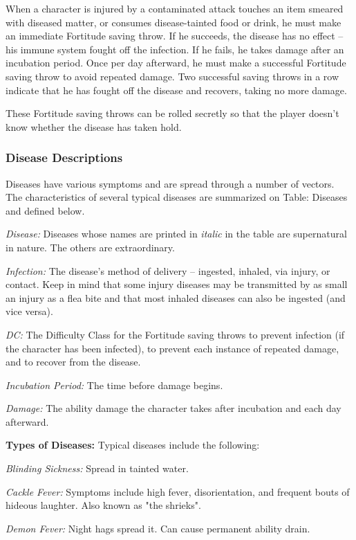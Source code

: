 When a character is injured by a contaminated attack touches an item smeared with 
diseased matter, or consumes disease-tainted food or drink, he must make an immediate 
Fortitude saving throw. If he succeeds, the disease has no effect -- his immune 
system fought off the infection. If he fails, he takes damage after an incubation 
period. Once per day afterward, he must make a successful Fortitude saving throw 
to avoid repeated damage. Two successful saving throws in a row indicate that he 
has fought off the disease and recovers, taking no more damage.

These Fortitude saving throws can be rolled secretly so that the player doesn't 
know whether the disease has taken hold.

\subsubsection{Disease Descriptions}

Diseases have various symptoms and are spread through a number of vectors. The 
characteristics of several typical diseases are summarized on Table: Diseases and 
defined below.

\textit{Disease:} Diseases whose names are printed in \textit{italic} in the table 
are supernatural in nature. The others are extraordinary.

\textit{Infection:} The disease's method of delivery -- ingested, inhaled, via injury, 
or contact. Keep in mind that some injury diseases may be transmitted by as small 
an injury as a flea bite and that most inhaled diseases can also be ingested (and 
vice versa).

\textit{DC:} The Difficulty Class for the Fortitude saving throws to prevent infection 
(if the character has been infected), to prevent each instance of repeated damage, 
and to recover from the disease.

\textit{Incubation Period:} The time before damage begins.

\textit{Damage:} The ability damage the character takes after incubation and each 
day afterward.

\textbf{Types of Diseases:} Typical diseases include the following:

\textit{Blinding Sickness:} Spread in tainted water.

\textit{Cackle Fever:} Symptoms include high fever, disorientation, and frequent 
bouts of hideous laughter. Also known as "the shrieks".

\textit{Demon Fever:} Night hags spread it. Can cause permanent ability drain.

